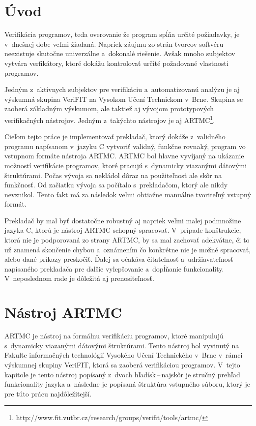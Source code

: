 
\chapter{Úvod}
Verifikácia programov, teda overovanie že program spĺňa určité požiadavky, je v~dnešnej dobe veľmi žiadaná. Napriek záujmu zo strán tvorcov softvéru neexistuje skutočne univerzálne a~dokonalé riešenie. Avšak mnoho subjektov vytvára verfikátory, ktoré dokážu kontrolovať určité požadované vlastnosti programov.

Jedným z~aktívnych subjektov pre verifikáciu a~automatizovanú analýzu je aj výskumná skupina VeriFIT na Vysokom Učení Technickom v~Brne. Skupina se zaoberá základným výskumom, ale taktiež aj vývojom prototypových verifikačných nástrojov. Jedným z~takýchto nástrojov je aj ARTMC\footnote{http://www.fit.vutbr.cz/research/groups/verifit/tools/artmc/}.

Cieľom tejto práce je implementovať prekladač, ktorý dokáže z~validného programu napísanom v~jazyku C vytvoriť validný, funkčne rovnaký, program vo vstupnom formáte nástroja ARTMC. ARTMC bol hlavne vyvíjaný na ukázanie možností verifikácie programov, ktoré pracujú s~dynamicky viazanými dátovými štruktúrami. Počas vývoja sa nekládol dôraz na použiteľnosť ale skôr na funkčnosť. Od začiatku vývoja sa počítalo s~prekladačom, ktorý ale nikdy nevznikol. Tento fakt má za následok veľmi obtiažne manuálne tvoriteľný vstupný formát.

Prekladač by mal byť dostatočne robustný aj napriek veľmi malej podmnožine jazyka C, ktorú je nástroj ARTMC schopný spracovať. V~prípade konštrukcie, ktorá nie je podporovaná zo strany ARTMC, by sa mal  zachovať adekvátne, či to už znamená skončenie chybou a~oznámením čo konkrétne nie je možné spracovať, alebo dané príkazy preskočiť. Ďalej sa očakáva čitateľnosť a~udržiavateľnosť napísaného prekladača pre ďalšie vylepšovanie a~dopĺňanie funkcionality. V~neposlednom rade je dôležitá aj prenositeľnosť.


\chapter{Nástroj ARTMC}
\label{kap_artmc}
ARTMC je nástroj na formálnu verifikáciu programov, ktoré manipulujú
s~dynamicky viazanými dátovými štruktúrami. Tento nástroj bol vyvinutý na Fakulte
informačných technológií Vysokého Učení Technického v~Brne v~rámci výskumnej skupiny VeriFIT,
ktorá sa zaoberá verifikáciou programov. V~tejto kapitole je tento nástroj
popísaný z~dvoch hľadísk\,--\,najskôr je stručný prehľad funkcionality jazyka
a~následne je popísaná štruktúra vstupného súboru, ktorý je pre túto prácu
najdôležitejší.

